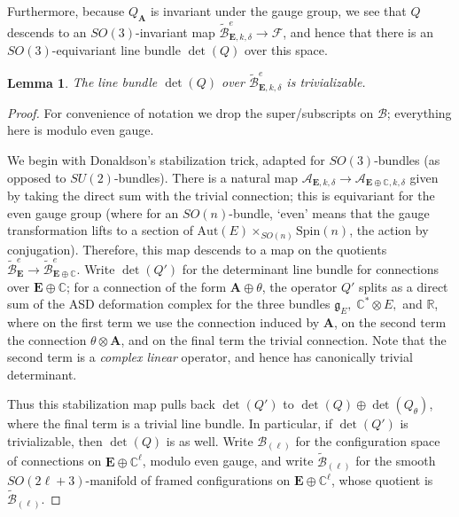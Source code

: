 \documentclass{memo-l}
\newtheorem{lemma}[theorem]{Lemma}
\theoremstyle{definition}
\theoremstyle{remark}
\numberwithin{section}{chapter}
\numberwithin{equation}{chapter}
\begin{document}
Furthermore, because $Q_{\mathbf{A}}$ is invariant under the gauge group, we see that $Q$ descends to an $SO(3)$-invariant map $\widetilde{\mathcal B}^e_{\mathbf{E},k,\delta} \to \mathcal F$, and hence that there is an $SO(3)$-equivariant line bundle $\det(Q)$ over this space.

\begin{lemma}\label{global-orientability}The line bundle $\det(Q)$ over $\widetilde{\mathcal B}^e_{\mathbf{E},k,\delta}$ is trivializable.
\end{lemma}
\begin{proof}For convenience of notation we drop the super/subscripts on $\mathcal B$; everything here is modulo even gauge.

We begin with Donaldson's stabilization trick, adapted for $SO(3)$-bundles (as opposed to $SU(2)$-bundles). There is a natural map $\mathcal A_{\mathbf{E},k,\delta} \to \mathcal A_{\mathbf{E} \oplus \mathbb C, k, \delta}$ given by taking the direct sum with the trivial connection; this is equivariant for the even gauge group (where for an $SO(n)$-bundle, `even' means that the gauge transformation lifts to a section of $\text{Aut}(E) \times_{SO(n)} \text{Spin}(n)$, the action by conjugation). Therefore, this map descends to a map on the quotients $\widetilde{\mathcal B}^e_{\mathbf{E}} \to \widetilde{\mathcal B}^e_{\mathbf{E} \oplus \mathbb C}.$ Write $\det(Q')$ for the determinant line bundle for connections over $\mathbf{E} \oplus \mathbb C$; for a connection of the form $\mathbf{A} \oplus \theta$, the operator $Q'$ splits as a direct sum of the ASD deformation complex for the three bundles $\mathfrak g_E, \;\mathbb C^* \otimes E,$ and  $\mathbb R$, where on the first term we use the connection induced by $\mathbf{A}$, on the second term the connection $\theta \otimes \mathbf{A}$, and on the final term the trivial connection. Note that the second term is a \emph{complex linear} operator, and hence has canonically trivial determinant.

Thus this stabilization map pulls back $\det(Q')$ to $\det(Q) \oplus \det(Q_\theta)$, where the final term is a trivial line bundle. In particular, if $\det(Q')$ is trivializable, then $\det(Q)$ is as well. Write $\mathcal B_{(\ell)}$ for the configuration space of connections on $\mathbf{E} \oplus \mathbb C^{\ell}$, modulo even gauge, and write $\widetilde{\mathcal B}_{(\ell)}$ for the smooth $SO(2\ell + 3)$-manifold of framed configurations on $\mathbf{E} \oplus \mathbb C^\ell$, whose quotient is $\widetilde{\mathcal B}_{(\ell)}$.


\end{proof}
\end{document}
